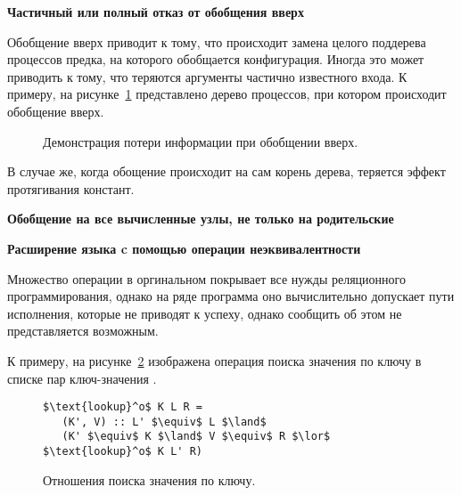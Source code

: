 \textbf{Частичный или полный отказ от обобщения вверх}

Обобщение вверх приводит к тому, что происходит замена целого поддерева процессов
предка, на которого обобщается конфигурация. Иногда это может приводить к тому, что
теряются аргументы частично известного входа. К примеру, на рисунке~\ref{fig:genup}
представлено дерево процессов, при котором происходит обобщение вверх.
\begin{figure}[h!]
\center
{}
\caption{Демонстрация потери информации при обобщении вверх.}
\label{fig:genup}
\end{figure}

В случае же, когда обощение происходит на сам корень дерева, теряется эффект протягивания
констант.

\textbf{Обобщение на все вычисленные узлы, не только на родительские}

\textbf{Расширение языка \ukanren c помощью операции неэквивалентности}

Множество операции в оргинальном \ukanren покрывает все нужды реляционного программирования,
однако на ряде программа оно вычислительно допускает пути исполнения, которые не приводят
к успеху, однако сообщить об этом не представляется возможным.

К примеру, на рисунке~\ref{fig:lookup} изображена операция поиска значения по ключу
в списке пар ключ-значения .

\begin{figure}[h!]
\begin{lstlisting}
$\text{lookup}^o$ K L R =
   (K', V) :: L' $\equiv$ L $\land$
   (K' $\equiv$ K $\land$ V $\equiv$ R $\lor$ $\text{lookup}^o$ K L' R)
\end{lstlisting}
\caption{Отношения поиска значения по ключу.}
\label{fig:lookup}
\end{figure}

